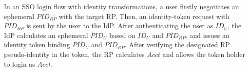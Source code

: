 In an SSO login flow with identity transformations,
    a user firstly negotiates an ephemeral $PID_{RP}$ with the target RP.
Then, an identity-token request with $PID_{RP}$ is sent by the user to the IdP.
After authenticating the user as $ID_U$, the IdP calculates an ephemeral $PID_U$ based on $ID_U$ and $PID_{RP}$,
    and issues an identity token binding $PID_U$ and $PID_{RP}$.
After verifying the designated RP pseudo-identity in the token,
    the RP calculates $Acct$ and allows the token holder to login as $Acct$.



